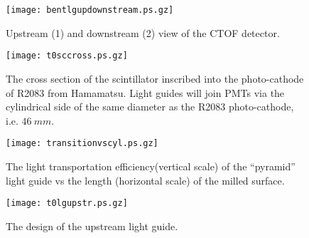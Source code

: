 \newpage
\begin{figure}[htbp]%
\begin{center}
\texttt{[image: bentlgupdownstream.ps.gz]}
\end{center}
\caption{%
Upstream (1) and downstream (2) view of the CTOF detector.
\label{bentlgud03}}
\end{figure}
\clearpage

%
\newpage
\begin{figure}[htbp]%
\begin{center}
\texttt{[image: t0sccross.ps.gz]}
\end{center}
\caption{%
The cross section of the scintillator inscribed into the 
photo-cathode of R2083 from Hamamatsu.  
Light guides will  join PMTs via the
cylindrical side of the same diameter as
the  R2083 photo-cathode, i.e. $46~mm$. 
\label{sccross}}
\end{figure}
\clearpage


\newpage

\begin{figure}[htbp]%
\begin{center}
\texttt{[image: transitionvscyl.ps.gz]}
\end{center}
\caption{%
The light transportation efficiency(vertical scale)  of the ``pyramid'' light guide vs the length 
(horizontal scale) of the milled surface.
\label{plgef}}
\end{figure}
\clearpage


\begin{figure}[htbp]%
\begin{center}
\texttt{[image: t0lgupstr.ps.gz]}
\end{center}
\caption{%
The design of the upstream light guide.
\label{lgupstream}}
\end{figure}
\clearpage

